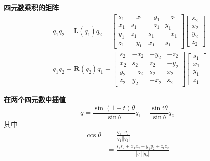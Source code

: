 \textbf{四元数乘积的矩阵}
$$
\begin{aligned}
& q_{1} q_{2}=\mathbf{L}\left(q_{1}\right) q_{2}= {\left[\begin{array}{cccc}
s_{1} & -x_{1} & -y_{1} & -z_{1} \\
x_{1} & s_{1} & -z_{1} & y_{1} \\
y_{1} & z_{1} & s_{1} & -x_{1} \\
z_{1} & -y_{1} & x_{1} & s_{1}
\end{array}\right]\left[\begin{array}{l}
s_{2} \\
x_{2} \\
y_{2} \\
z_{2}
\end{array}\right] } \\
& q_{1} q_{2}=\mathbf{R}\left(q_{2}\right) q_{1}=\left[\begin{array}{cccc}
s_{2} & -x_{2} & -y_{2} & -z_{2} \\
x_{2} & s_{2} & z_{2} & -y_{2} \\
y_{2} & -z_{2} & s_{2} & x_{2} \\
z_{2} & y_{2} & -x_{2} & s_{2}
\end{array}\right]\left[\begin{array}{l}
s_{1} \\
x_{1} \\
y_{1} \\
z_{1}
\end{array}\right]
\end{aligned}
$$

\textbf{在两个四元数中插值}
$$
q=\frac{\sin (1-t) \theta}{\sin \theta} q_{1}+\frac{\sin t \theta}{\sin \theta} q_{2}
$$
其中
$$
\begin{aligned}
\cos \theta & =\frac{q_{1} \cdot q_{2}}{\left|q_{1}\right|\left|q_{2}\right|} \\
& =\frac{s_{1} s_{2}+x_{1} x_{2}+y_{1} y_{2}+z_{1} z_{2}}{\left|q_{1}\right|\left|q_{2}\right|}
\end{aligned}
$$

